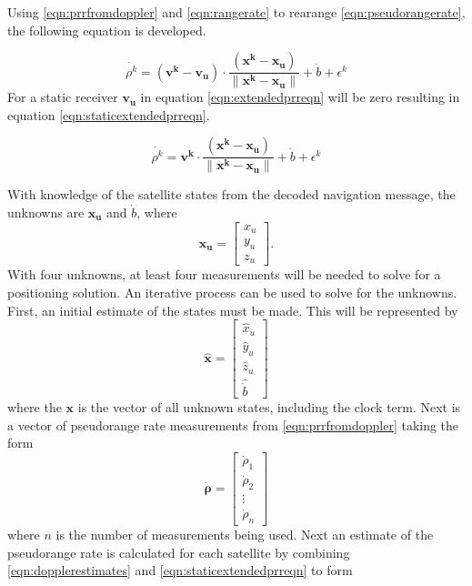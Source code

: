 \documentclass[12pt]{report}
\begin{document}
Using \ref{eqn:prrfromdoppler} and \ref{eqn:rangerate} to rearange \ref{eqn:pseudorangerate}, the following equation is developed.

\begin{equation}
    \dot{\rho^{k}} = (\mathbf{v^{k}} - \mathbf{v_u}) \cdot \frac{(\mathbf{x^k} - \mathbf{x_u})}{\| \mathbf{x^k} - \mathbf{x_u}\|} + \dot{b} + \epsilon^{k}
    \label{eqn:extendedprreqn}
\end{equation}
For a static receiver $\mathbf{v_u}$ in equation \ref{eqn:extendedprreqn} will be zero resulting in equation \ref{eqn:staticextendedprreqn}.

\begin{equation}
    \dot{\rho^{k}} = \mathbf{v^{k}} \cdot \frac{(\mathbf{x^k} - \mathbf{x_u})}{\| \mathbf{x^k} - \mathbf{x_u}\|} + \dot{b} + \epsilon^{k}
    \label{eqn:staticextendedprreqn}
\end{equation}

With knowledge of the satellite states from the decoded navigation message, the unknowns are $\mathbf{x_u}$ and $\dot{b}$, where
\begin{equation}
\mathbf{x_u} = 
\begin{bmatrix}
        x_u\\
        y_u\\
        z_u 
\end{bmatrix}.
\end{equation}
With four unknowns, at least four measurements will be needed to solve for a positioning solution. An iterative process can be used to solve for the unknowns. 
First, an initial estimate of the states must be made. This will be represented by
\begin{equation}
    \mathbf{\hat{x}} = 
    \begin{bmatrix}
        \hat{x}_u\\
        \hat{y}_u\\
        \hat{z}_u\\
        \hat{\dot{b}}
    \end{bmatrix}
    \label{eqn:dopplerestimates}
\end{equation}
where the $\mathbf{x}$ is the vector of all unknown states, including the clock term.
Next is a vector of pseudorange rate measurements from \ref{eqn:prrfromdoppler} taking the form
\begin{equation}
\mathbf{\dot{\rho}} = \begin{bmatrix}
    \dot{\rho}_1 \\
    \dot{\rho}_2 \\
    \vdots\\
    \dot{\rho}_n
\end{bmatrix}
\end{equation}
where $n$ is the number of measurements being used. Next an estimate of the pseudorange rate is calculated for each satellite by combining \ref{eqn:dopplerestimates} and \ref{eqn:staticextendedprreqn} to form 
\end{document}
